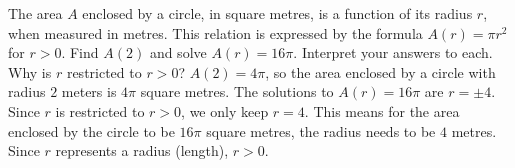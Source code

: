 {The area $A$ enclosed by a circle, in square metres, is a function of its radius $r$, when measured in metres.  This relation is expressed by the formula $A(r) = \pi r^2$ for $r > 0$.  Find $A(2)$ and solve $A(r) = 16\pi$.  Interpret your answers to each.  Why is $r$ restricted to $r > 0$?}
{$A(2) = 4\pi$, so the area enclosed by a circle with radius $2$ meters is $4\pi$ square metres.  The solutions to $A(r) = 16\pi$ are $r = \pm 4$.  Since $r$ is restricted to $r > 0$, we only keep $r = 4$.  This means for the area enclosed by the circle to be $16\pi$ square metres, the radius needs to be $4$ metres.  Since $r$ represents a radius (length), $r > 0$.}
